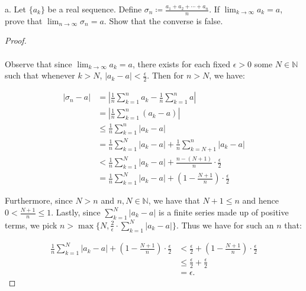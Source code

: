 a.  Let $\{a_k\}$ be a real sequence. Define
    $\sigma_n \coloneqq \frac{a_1 + a_2 + \cdots + a_n}{n}$. If 
    $\lim_{k \rightarrow \infty}{a_k} = a$, prove that
     $\lim_{n \rightarrow \infty}{\sigma_n} = a$.  Show that the converse is
    false.

    \begin{proof}\ \\\\

        Observe that since $\lim_{k \rightarrow \infty}{a_k} = a$, there exists
        for each fixed $\epsilon > 0$ some $N \in \mathbb{N}$ such that
        whenever $k > N$, $|a_k - a| < \frac{\epsilon}{2}$. Then for
        $n > N$, we have:

        \begin{align*}
            |\sigma_n - a|
             &= \left|\frac{1}{n}\sum\limits_{k=1}^{n}{a_k} - \frac{1}{n}\sum\limits_{k=1}^{n}{a} \right| \\
             &= \left|\frac{1}{n}\sum\limits_{k=1}^{n}{\left(a_k - a\right)} \right| \\
             &\le \frac{1}{n}\sum\limits_{k=1}^{n}{|a_k - a|} \\
             &= \frac{1}{n}\sum\limits_{k=1}^{N}{|a_k - a|} + \frac{1}{n}\sum\limits_{k=N+1}^{n}{|a_k - a|} \\
             &< \frac{1}{n}\sum\limits_{k=1}^{N}{|a_k - a|} + \frac{n - (N + 1)}{n} \cdot \frac{\epsilon}{2} \\
             &= \frac{1}{n}\sum\limits_{k=1}^{N}{|a_k - a|} + \left(1 - \frac{N + 1}{n}\right) \cdot \frac{\epsilon}{2}
        \end{align*}

        Furthermore, since $N > n$ and $n, N \in \mathbb{N}$, we have that
        $N + 1 \le n$ and hence $0 < \frac{N + 1}{n} \le 1$. Lastly, since
        $\sum\limits_{k=1}^{N}{|a_k - a|}$ is a finite series made up of
        positive terms, we pick
        $n > \max{\{N, \frac{2}{\epsilon} \cdot \sum\limits_{k=1}^{N}{|a_k - a|}\}}$.
        Thus we have for such an $n$ that:

        \begin{align*}
            \frac{1}{n}\sum\limits_{k=1}^{N}{|a_k - a|} + \left(1 - \frac{N + 1}{n}\right) \cdot \frac{\epsilon}{2}
              &< \frac{\epsilon}{2} + \left(1 - \frac{N + 1}{n}\right) \cdot \frac{\epsilon}{2} \\
              &\le \frac{\epsilon}{2} + \frac{\epsilon}{2} \\
              &= \epsilon.
        \end{align*}


\end{proof}
